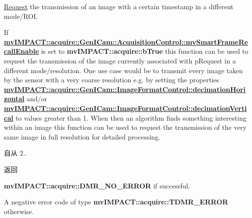 \hyperlink{classmv_i_m_p_a_c_t_1_1acquire_1_1_request}{Request} the transmission of an image with a certain timestamp in a different mode/\+R\+O\+I. 

If {\bfseries \hyperlink{classmv_i_m_p_a_c_t_1_1acquire_1_1_gen_i_cam_1_1_acquisition_control_aeb86056e3eb76d5c80c4048ac9ba10d5}{mv\+I\+M\+P\+A\+C\+T\+::acquire\+::\+Gen\+I\+Cam\+::\+Acquisition\+Control\+::mv\+Smart\+Frame\+Recall\+Enable}} is set to {\bfseries mv\+I\+M\+P\+A\+C\+T\+::acquire\+::b\+True} this function can be used to request the transmission of the image currently associated with {\ttfamily p\+Request} in a different mode/resolution. One use case would be to transmit every image taken by the sensor with a very coarse resolution e.\+g. by setting the properties {\bfseries \hyperlink{classmv_i_m_p_a_c_t_1_1acquire_1_1_gen_i_cam_1_1_image_format_control_af3c2ae5e5f9aaea7a762f3cd10ce1ebb}{mv\+I\+M\+P\+A\+C\+T\+::acquire\+::\+Gen\+I\+Cam\+::\+Image\+Format\+Control\+::decimation\+Horizontal}} and/or {\bfseries \hyperlink{classmv_i_m_p_a_c_t_1_1acquire_1_1_gen_i_cam_1_1_image_format_control_aee18567f6502e019607cab86903a68af}{mv\+I\+M\+P\+A\+C\+T\+::acquire\+::\+Gen\+I\+Cam\+::\+Image\+Format\+Control\+::decimation\+Vertical}} to values greater than 1. When then an algorithm finds something interesting within an image this function can be used to request the transmission of the very same image in full resolution for detailed processing.

\begin{DoxySince}{自从}
2.. 
\end{DoxySince}
\begin{DoxyReturn}{返回}

\begin{DoxyItemize}
\item {\bfseries mv\+I\+M\+P\+A\+C\+T\+::acquire\+::\+D\+M\+R\+\_\+\+N\+O\+\_\+\+E\+R\+R\+O\+R} if successful.
\item A negative error code of type {\bfseries mv\+I\+M\+P\+A\+C\+T\+::acquire\+::\+T\+D\+M\+R\+\_\+\+E\+R\+R\+O\+R} otherwise. 
\end{DoxyItemize}
\end{DoxyReturn}


